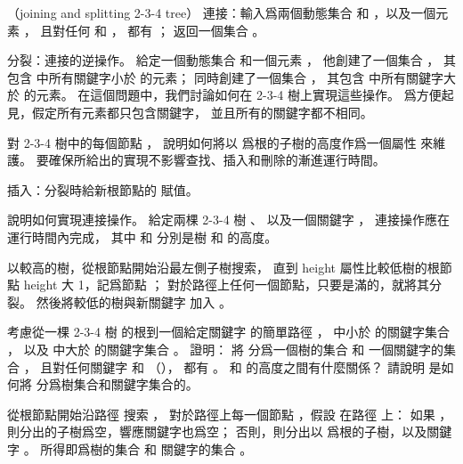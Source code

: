 \startANSWER
{}
\stopANSWER

\stopPROBLEM

\startPROBLEM
（joining and splitting 2-3-4 tree）
{\EMP 連接}：輸入爲兩個動態集合  和 ，以及一個元素 ，
且對任何  和 ，
都有 ；
返回一個集合 。

{\EMP 分裂}：{\EMP 連接}的逆操作。
給定一個動態集合  和一個元素 ，
他創建了一個集合 ，
其包含  中所有關鍵字小於  的元素；
同時創建了一個集合 ，
其包含  中所有關鍵字大於  的元素。
在這個問題中，我們討論如何在 2-3-4 樹上實現這些操作。
爲方便起見，假定所有元素都只包含關鍵字，
並且所有的關鍵字都不相同。

\startigBase[a]\startitem
對 2-3-4 樹中的每個節點 ，
說明如何將以  爲根的子樹的高度作爲一個屬性  來維護。
要確保所給出的實現不影響查找、插入和刪除的漸進運行時間。
\stopitem\stopigBase

\startANSWER
插入：分裂時給新根節點的  賦值。
\stopANSWER

\startigBase[continue]\startitem
說明如何實現連接操作。
給定兩棵 2-3-4 樹 、  以及一個關鍵字 ，
連接操作應在  運行時間內完成，
其中  和  分別是樹  和  的高度。
\stopitem\stopigBase

\startANSWER
以較高的樹，從根節點開始沿最左側子樹搜索，
直到 height 屬性比較低樹的根節點 height 大 1，記爲節點 ；
對於路徑上任何一個節點，只要是滿的，就將其分裂。
然後將較低的樹與新關鍵字  加入 。
\stopANSWER

\startigBase[continue]\startitem
考慮從一棵 2-3-4 樹  的根到一個給定關鍵字  的簡單路徑 ，
  中小於  的關鍵字集合 ，
以及  中大於  的關鍵字集合 。
證明：  將  分爲一個樹的集合  和
一個關鍵字的集合 ，
且對任何關鍵字  和  （），
都有 。
  和  的高度之間有什麼關係？
請說明  是如何將  分爲樹集合和關鍵字集合的。
\stopitem\stopigBase

\startANSWER
從根節點開始沿路徑  搜索 ，
對於路徑上每一個節點 ，假設  在路徑  上：
如果 ，則分出的子樹爲空，響應關鍵字也爲空；
否則，則分出以  爲根的子樹，以及關鍵字 。
所得即爲樹的集合  和
關鍵字的集合 。

